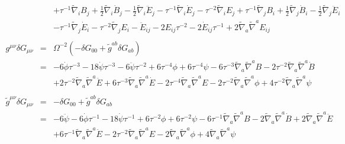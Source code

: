 \documentclass[10pt,letterpaper]{article}
\numberwithin{equation}{section}
\begin{document}
\begin{eqnarray}
&&+\tau^{-1} \tilde\nabla_{i}B_{j}
+ \tfrac{1}{2} \tilde\nabla_{i}\dot{B}_{j}
-  \tfrac{1}{2} \tilde\nabla_{i}\ddot{E}_{j}
-  \tau^{-1} \tilde\nabla_{i}\dot{E}_{j}
-  \tau^{-2} \tilde\nabla_{i}E_{j}
+ \tau^{-1} \tilde\nabla_{j}B_{i}
+ \tfrac{1}{2} \tilde\nabla_{j}\dot{B}_{i}
-  \tfrac{1}{2} \tilde\nabla_{j}\ddot{E}_{i}\nonumber\\
&& -  \tau^{-1} \tilde\nabla_{j}\dot{E}_{i}
-  \tau^{-2} \tilde\nabla_{j}E_{i}
- \ddot{E}_{ij}
- 2 E_{ij} \tau^{-2}
- 2 \dot{E}_{ij} \tau^{-1}
+ 2 \tilde\nabla_{a}\tilde\nabla^{a}E_{ij}
\\ \nonumber\\
g^{\mu\nu}\delta G_{\mu\nu}&=& \Omega^{-2}(-\delta G_{00} + \tilde g^{ab}\delta G_{ab})
\nonumber\\
&=& -6 \dot{\phi} \tau^{-3}
- 18 \dot{\psi} \tau^{-3}
- 6 \ddot{\psi} \tau^{-2}
+ 6 \tau^{-4} \phi
+ 6 \tau^{-4} \psi
- 6 \tau^{-3} \tilde{\nabla}_{a}\tilde{\nabla}^{a}B
- 2 \tau^{-2} \tilde{\nabla}_{a}\tilde{\nabla}^{a}\dot{B}\nonumber\\
&& + 2 \tau^{-2} \tilde{\nabla}_{a}\tilde{\nabla}^{a}\ddot{E}
+ 6 \tau^{-3} \tilde{\nabla}_{a}\tilde{\nabla}^{a}\dot{E}
- 2 \tau^{-4} \tilde{\nabla}_{a}\tilde{\nabla}^{a}E
- 2 \tau^{-2} \tilde{\nabla}_{a}\tilde{\nabla}^{a}\phi
+ 4 \tau^{-2} \tilde{\nabla}_{a}\tilde{\nabla}^{a}\psi
\\ \nonumber\\
\tilde g^{\mu\nu}\delta G_{\mu\nu}&=& -\delta G_{00} + \tilde g^{ab}\delta G_{ab}
\nonumber\\
&=&-6 \ddot{\psi}
- 6 \dot{\phi} \tau^{-1}
- 18 \dot{\psi} \tau^{-1}
+ 6 \tau^{-2} \phi
+ 6 \tau^{-2} \psi
- 6 \tau^{-1} \tilde{\nabla}_{a}\tilde{\nabla}^{a}B
- 2 \tilde{\nabla}_{a}\tilde{\nabla}^{a}\dot{B}
+ 2 \tilde{\nabla}_{a}\tilde{\nabla}^{a}\ddot{E}\nonumber\\
&& + 6 \tau^{-1} \tilde{\nabla}_{a}\tilde{\nabla}^{a}\dot{E}
- 2 \tau^{-2} \tilde{\nabla}_{a}\tilde{\nabla}^{a}E
- 2 \tilde{\nabla}_{a}\tilde{\nabla}^{a}\phi
+ 4 \tilde{\nabla}_{a}\tilde{\nabla}^{a}\psi
\end{eqnarray}

%
%
%
%
\end{document}
